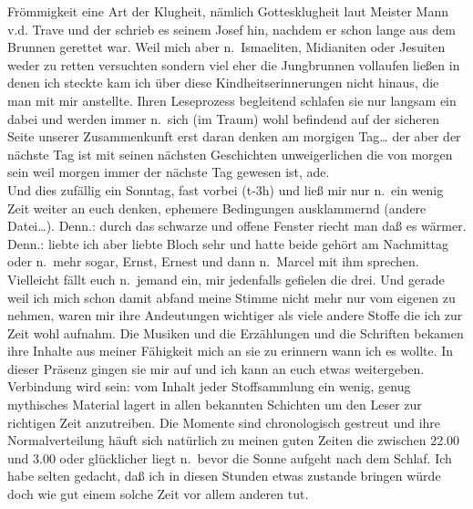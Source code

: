 \documentclass[
]{article}
\begin{document}
Frömmigkeit eine Art der Klugheit, nämlich Gottesklugheit laut Meister
Mann v.d. Trave und der schrieb es seinem Josef hin, nachdem er schon
lange aus dem Brunnen gerettet war. Weil mich aber n.~Ismaeliten,
Midianiten oder Jesuiten weder zu retten versuchten sondern viel eher
die Jungbrunnen vollaufen ließen in denen ich steckte kam ich über diese
Kindheitserinnerungen nicht hinaus, die man mit mir anstellte. Ihren
Leseprozess begleitend schlafen sie nur langsam ein dabei und werden
immer n.~sich (im Traum) wohl befindend auf der sicheren Seite unserer
Zusammenkunft erst daran denken am morgigen Tag\ldots{} der aber der
nächste Tag ist mit seinen nächsten Geschichten unweigerlichen die von
morgen sein weil morgen immer der nächste Tag gewesen ist, ade.\\
Und dies zufällig ein Sonntag, fast vorbei (t-3h) und ließ mir nur
n.~ein wenig Zeit weiter an euch denken, ephemere Bedingungen
ausklammernd (andere Datei\ldots). Denn.: durch das schwarze und offene
Fenster riecht man daß es wärmer. Denn.: liebte ich aber liebte Bloch
sehr und hatte beide gehört am Nachmittag oder n.~mehr sogar, Ernst,
Ernest und dann n.~Marcel mit ihm sprechen. Vielleicht fällt euch
n.~jemand ein, mir jedenfalls gefielen die drei. Und gerade weil ich
mich schon damit abfand meine Stimme nicht mehr nur vom eigenen zu
nehmen, waren mir ihre Andeutungen wichtiger als viele andere Stoffe die
ich zur Zeit wohl aufnahm. Die Musiken und die Erzählungen und die
Schriften bekamen ihre Inhalte aus meiner Fähigkeit mich an sie zu
erinnern wann ich es wollte. In dieser Präsenz gingen sie mir auf und
ich kann an euch etwas weitergeben. Verbindung wird sein: vom Inhalt
jeder Stoffsammlung ein wenig, genug mythisches Material lagert in allen
bekannten Schichten um den Leser zur richtigen Zeit anzutreiben. Die
Momente sind chronologisch gestreut und ihre Normalverteilung häuft sich
natürlich zu meinen guten Zeiten die zwischen 22.00 und 3.00 oder
glücklicher liegt n.~bevor die Sonne aufgeht nach dem Schlaf. Ich habe
selten gedacht, daß ich in diesen Stunden etwas zustande bringen würde
doch wie gut einem solche Zeit vor allem anderen tut.
\end{document}
